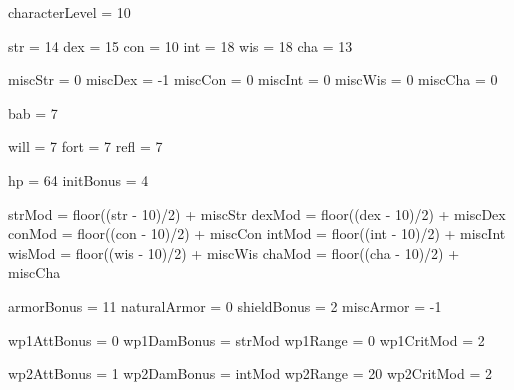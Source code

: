 \documentclass[10pt]{article}
\begin{document}
\newcommand{\charName}{Dearth}
\newcommand{\charRace}{Oakling}
\newcommand{\charAge}{30}
\newcommand{\charGod}{Leshii}
\newcommand{\charAlign}{N}
\newcommand{\charSize}{Medium}
\newcommand{\class}{10 Druid / 10 Alchemist}
\begin{sagesilent}

	characterLevel = 10

	str = 14
	dex = 15
	con = 10
	int = 18
	wis = 18
	cha = 13

	miscStr = 0
	miscDex = -1
	miscCon = 0
	miscInt = 0
	miscWis = 0
	miscCha = 0

	bab = 7

	will = 7
	fort = 7
	refl = 7

	hp = 64
	initBonus = 4

	strMod = floor((str - 10)/2) + miscStr
	dexMod = floor((dex - 10)/2) + miscDex
	conMod = floor((con - 10)/2) + miscCon
	intMod = floor((int - 10)/2) + miscInt
	wisMod = floor((wis - 10)/2) + miscWis
	chaMod = floor((cha - 10)/2) + miscCha

\end{sagesilent}

\begin{sagesilent}

	armorBonus = 11
	naturalArmor = 0
	shieldBonus = 2
	miscArmor = -1

\end{sagesilent}

\newcommand{\armOneName}{Dragonscale Plate}
\newcommand{\armTwoName}{Shield}
\newcommand{\armThreeName}{Ring of Protection}
\newcommand{\armOneBonus}{+9 Armor}
\newcommand{\armTwoBonus}{+2 Shield}
\newcommand{\armThreeBonus}{+2 Armor}
\begin{sagesilent}

	wp1AttBonus = 0
	wp1DamBonus = strMod
	wp1Range = 0
	wp1CritMod = 2
	
	wp2AttBonus = 1
	wp2DamBonus = intMod
	wp2Range = 20
	wp2CritMod = 2 

\end{sagesilent}
\end{document}
